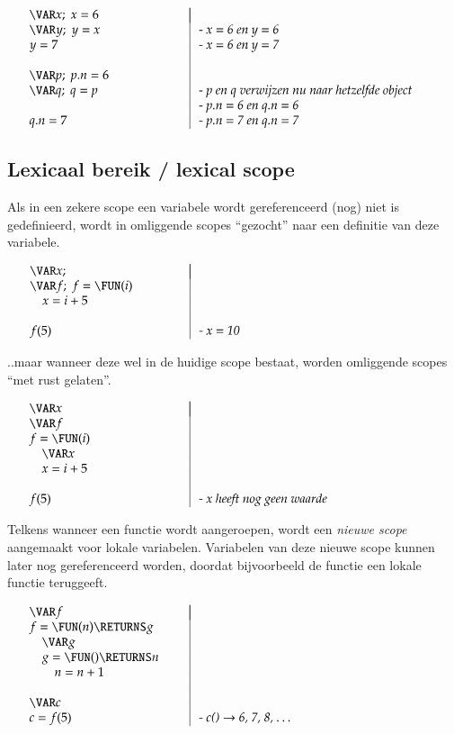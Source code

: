 \documentclass[11pt,oneside,parskip=half]{scrbook}
\makeatletter
\def\IN{\quad}
\newcommand{\<}
  {\ensuremath{\langle}}
\renewcommand{\>}
  {\ensuremath{\rangle}}
\newenvironment{SyntaxExample}{%
\vspace{-1.6pc}%
	\begin{equation*}%
		\begin{array}{l@{\hspace*{.02\textwidth}}|@{\hspace*{.02\textwidth}}l}%
		\hspace*{.35\textwidth} & \hspace*{.55\textwidth} \\[-1pc]%
}{%
		\end{array}%
	\end{equation*}%
\vspace{-.6pc}%
}
\makeatother
\begin{document}
	\begin{SyntaxExample}
		\VAR x;\; x = 6 \\
		\VAR y;\; y = x & \textit{- x = 6 en y = 6} \\
		y = 7 & \textit{- x = 6 en y = 7} \\
		\\
		\VAR p;\; p.n = 6 \\
		\VAR q;\; q = p & \textit{- p en q verwijzen nu naar hetzelfde object} \\
		& \textit{- p.n = 6 en q.n = 6} \\
		q.n = 7 & \textit{- p.n = 7 en q.n = 7}
	\end{SyntaxExample}

\subsection{Lexicaal bereik / lexical scope}

Als in een zekere scope een variabele wordt gereferenceerd (nog) niet is gedefinieerd, wordt in omliggende scopes ``gezocht'' naar een definitie van deze variabele.

	\begin{SyntaxExample}
		\VAR x; \\
		\VAR f;\; f = \FUN(i) \\
		\IN x = i + 5 \\
		\\
		f(5) & \textit{- x = 10}
	\end{SyntaxExample}

..maar wanneer deze wel in de huidige scope bestaat, worden omliggende scopes ``met rust gelaten''.

	\begin{SyntaxExample}
		\VAR x \\
		\VAR f \\
		f = \FUN(i) \\
		\IN \VAR x \\
		\IN x = i + 5 \\
		\\
		f(5) & \textit{- x heeft nog geen waarde}
	\end{SyntaxExample}

Telkens wanneer een functie wordt aangeroepen, wordt een \emph{nieuwe scope} aangemaakt voor lokale variabelen. Variabelen van deze nieuwe scope kunnen later nog gereferenceerd worden, doordat bijvoorbeeld de functie een lokale functie teruggeeft.

	\begin{SyntaxExample}
		\VAR f \\
		f = \FUN(n) \RETURNS g \\
		\IN \VAR g \\
		\IN g = \FUN() \RETURNS n \\
		\IN \IN n = n + 1 \\
		\\
		\VAR c \\
		c = f(5) & \textit{- c() $\rightarrow$ 6, 7, 8, \dots}
	\end{SyntaxExample}
\end{document}
